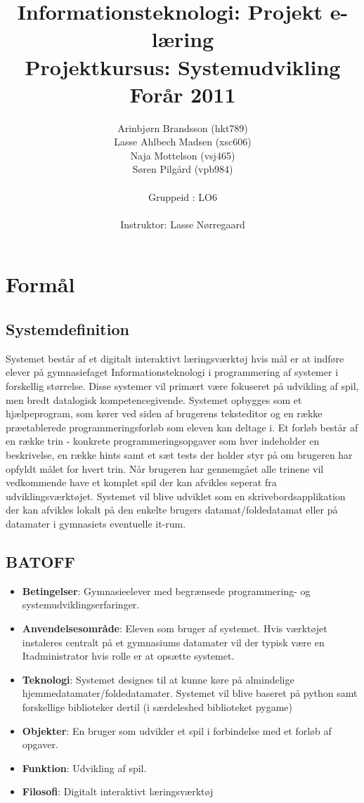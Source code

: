 \documentclass[10pt,a4paper,danish]{article}
\title{Informationsteknologi: Projekt e-læring \\ Projektkursus: Systemudvikling \\Forår 2011}
\author{Arinbjørn Brandsson (hkt789)\\Lasse Ahlbech Madsen (xsc606)\\Naja Mottelson (vsj465)\\Søren Pilgård (vpb984)\\
\\
Gruppeid : LO6\\
\\Instruktor: Lasse Nørregaard}
\begin{document}
\maketitle
\newpage

\tableofcontents
\newpage

\section{Formål}
\subsection{Systemdefinition}
Systemet består af et digitalt interaktivt læringsværktøj hvis mål er at indføre elever på gymnasiefaget Informationsteknologi i programmering af systemer i forskellig størrelse. Disse systemer vil primært være fokuseret på udvikling af spil, men bredt datalogisk kompetencegivende. Systemet opbygges som et hjælpeprogram, som kører ved siden af brugerens teksteditor og en række præetablerede programmeringsforløb som eleven kan deltage i. Et forløb består af en række trin - konkrete programmeringsopgaver som hver indeholder en beskrivelse, en række hints samt et sæt tests der holder styr på om brugeren har opfyldt målet for hvert trin. Når brugeren har gennemgået alle trinene vil vedkommende have et komplet spil der kan afvikles seperat fra udviklingsværktøjet. Systemet vil blive udviklet som en skrivebordsapplikation der kan afvikles lokalt på den enkelte brugers datamat/foldedatamat eller på datamater i gymnasiets eventuelle it-rum.

\subsection{BATOFF}
\begin{itemize}
\item \textbf{Betingelser}: Gymnasieelever med begrænsede programmering- og systemudviklingserfaringer. 
\item \textbf{Anvendelsesområde}: Eleven som bruger af systemet. Hvis værktøjet instaleres centralt på et
gymnasiums datamater vil der typisk være en Itadministrator hvis rolle er at opsætte systemet.
\item \textbf{Teknologi}: Systemet designes til at kunne køre på almindelige hjemmedatamater/foldedatamater.
Systemet vil blive baseret på python samt forskellige biblioteker dertil (i særdeleshed biblioteket pygame)
\item \textbf{Objekter}: En bruger som udvikler et spil i forbindelse med et forløb af opgaver. 
\item \textbf{Funktion}: Udvikling af spil.
\item \textbf{Filosofi}:  Digitalt interaktivt læringsværktøj
\end{itemize}
\end{document}
